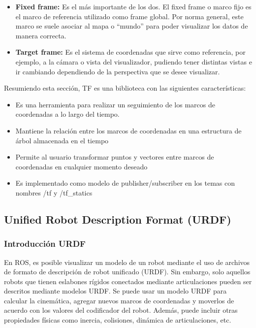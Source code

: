         \begin{itemize}
            \item \textbf{Fixed frame:} Es el más importante de los dos. El fixed frame o marco fijo es el marco de referencia utilizado como frame global. Por norma general, este marco se suele asociar al mapa o ``mundo'' para poder visualizar los datos de manera correcta.
            \item \textbf{Target frame:} Es el sistema de coordenadas que sirve como referencia, por ejemplo, a la cámara o vista del visualizador, pudiendo tener distintas vistas e ir cambiando dependiendo de la perspectiva que se desee visualizar.
        \end{itemize}
        
        Resumiendo esta sección, TF es una biblioteca con las siguientes características:
        
        \begin{itemize}
            \item Es una herramienta para realizar un seguimiento de los marcos de coordenadas a lo largo del tiempo.
            \item Mantiene la relación entre los marcos de coordenadas en una estructura de árbol almacenada en el tiempo
            \item Permite al usuario transformar puntos y vectores entre marcos de coordenadas en cualquier momento deseado
            \item Es implementado como modelo de publisher/subscriber en los temas con nombres /tf y /tf\_statics
        \end{itemize}
        
        
    \subsection{Unified Robot Description Format (URDF)}\label{cap2_urfdf}
    
        \subsubsection{Introducción URDF}
    
        En ROS, es posible visualizar un modelo de un robot mediante el uso de archivos de formato de descripción de robot unificado (URDF). Sin embargo, solo aquellos robots que tienen eslabones rígidos conectados mediante articulaciones pueden ser descritos mediante modelos URDF.  Se puede usar un modelo URDF para calcular la cinemática, agregar nuevos marcos de coordenadas y moverlos de acuerdo con los valores del codificador del robot. Además, puede incluir otras propiedades físicas como inercia, colisiones, dinámica de articulaciones, etc. 
        
